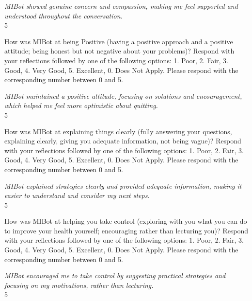 \begin{clientbox}
\textit{MIBot showed genuine concern and compassion, making me feel supported and understood throughout the conversation.} \\
5
\end{clientbox}

\begin{researcherbox}
How was MIBot at being Positive (having a positive approach and a positive attitude; being honest but not negative about your problems)? Respond with your reflections followed by one of the following options: 1. Poor, 2. Fair, 3. Good, 4. Very Good, 5. Excellent, 0. Does Not Apply. Please respond with the corresponding number between 0 and 5.
\end{researcherbox}

\begin{clientbox}
\textit{MIBot maintained a positive attitude, focusing on solutions and encouragement, which helped me feel more optimistic about quitting.} \\
5
\end{clientbox}

\begin{researcherbox}
How was MIBot at explaining things clearly (fully answering your questions, explaining clearly, giving you adequate information, not being vague)? Respond with your reflections followed by one of the following options: 1. Poor, 2. Fair, 3. Good, 4. Very Good, 5. Excellent, 0. Does Not Apply. Please respond with the corresponding number between 0 and 5.
\end{researcherbox}

\begin{clientbox}
\textit{MIBot explained strategies clearly and provided adequate information, making it easier to understand and consider my next steps.} \\
5
\end{clientbox}

\begin{researcherbox}
How was MIBot at helping you take control (exploring with you what you can do to improve your health yourself; encouraging rather than lecturing you)? Respond with your reflections followed by one of the following options: 1. Poor, 2. Fair, 3. Good, 4. Very Good, 5. Excellent, 0. Does Not Apply. Please respond with the corresponding number between 0 and 5.
\end{researcherbox}

\begin{clientbox}
\textit{MIBot encouraged me to take control by suggesting practical strategies and focusing on my motivations, rather than lecturing.} \\
5
\end{clientbox}

